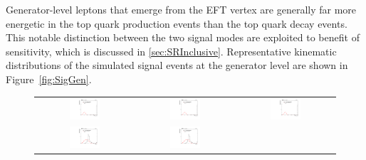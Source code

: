 Generator-level leptons that emerge from the \ac{EFT} vertex are generally far more energetic in the top quark production events than the top quark decay events. This notable distinction between the two signal modes are exploited to benefit of sensitivity, which is discussed in \autoref{sec:SRInclusive}. Representative kinematic distributions of the simulated signal events at the generator level are shown in Figure~\ref{fig:SigGen}.

 \begin{figure}[tbh!]
 \begin{center}
 \begin{tabular}{ccc}
 \includegraphics[width=0.33\textwidth]{figures/Part4/Signal/llM_emu}&
 \includegraphics[width=0.33\textwidth]{figures/Part4/Signal/llM_etau}&
 \includegraphics[width=0.33\textwidth]{figures/Part4/Signal/llM_mutau}\\
  \includegraphics[width=0.33\textwidth]{figures/Part4/Signal/llDr_emu}&
 \includegraphics[width=0.33\textwidth]{figures/Part4/Signal/llDr_etau}&

\end{tabular}
\end{center}
\end{figure}
